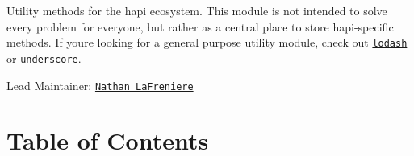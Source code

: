 

Utility methods for the hapi ecosystem. This module is not intended to solve every problem for everyone, but rather as a central place to store hapi-\/specific methods. If you\textquotesingle{}re looking for a general purpose utility module, check out \href{https://github.com/lodash/lodash}{\tt lodash} or \href{https://github.com/jashkenas/underscore}{\tt underscore}.

\href{http://travis-ci.org/hapijs/hoek}{\tt }

Lead Maintainer\+: \href{https://github.com/nlf}{\tt Nathan La\+Freniere}

\section*{Table of Contents}


